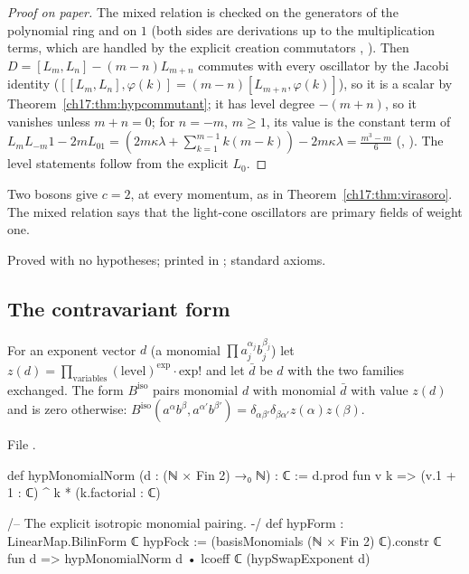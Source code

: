 \begin{proof}[Proof on paper]
The mixed relation is checked on the generators of the polynomial ring and
on $1$ (both sides are derivations up to the multiplication terms, which are handled by the explicit
creation commutators , ).  Then
$D=[L_m,L_n]-(m-n)L_{m+n}$ commutes with every oscillator by the Jacobi identity
($[[L_m,L_n],\varphi(k)]=(m-n)[L_{m+n},\varphi(k)]$), so it is a scalar by Theorem~\ref{ch17:thm:hypcommutant}; it has level
degree $-(m+n)$, so it vanishes unless $m+n=0$; for $n=-m$, $m\ge1$, its value is the constant term of
$L_mL_{-m}1-2mL_01=(2m\kappa\lambda+\sum_{k=1}^{m-1}k(m-k))-2m\kappa\lambda=\frac{m^3-m}6$
(, ).  The level statements follow from
the explicit $L_0$.
\end{proof}

\begin{physics}
Two bosons give $c=2$, at every momentum, as in Theorem~\ref{ch17:thm:virasoro}.  The mixed relation says
that the light-cone oscillators are primary fields of weight one.
\end{physics}

\begin{status}
Proved with no hypotheses; printed in ; standard axioms.
\end{status}

\subsection{The contravariant form}

\begin{definition}\label{ch17:def:hypform}
For an exponent vector $d$ (a monomial $\prod a_j^{\alpha_j}b_j^{\beta_j}$) let $z(d)=\prod_{\text{variables}}(\text{level})^{\text{exp}}\cdot\text{exp}!$
and let $\bar d$ be $d$ with the two families exchanged.  The form $B^{\mathrm{iso}}$ pairs monomial $d$ with
monomial $\bar d$ with value $z(d)$ and is zero otherwise: $B^{\mathrm{iso}}(a^\alpha b^\beta,a^{\alpha'}b^{\beta'})=\delta_{\alpha\beta'}\delta_{\beta\alpha'}z(\alpha)z(\beta)$.
\end{definition}

\noindent File .
\begin{leancode}
def hypMonomialNorm (d : (ℕ × Fin 2) →₀ ℕ) : ℂ :=
  d.prod fun v k => (v.1 + 1 : ℂ) ^ k * (k.factorial : ℂ)

/-- The explicit isotropic monomial pairing. -/
def hypForm : LinearMap.BilinForm ℂ hypFock :=
  (basisMonomials (ℕ × Fin 2) ℂ).constr ℂ fun d =>
    hypMonomialNorm d • lcoeff ℂ (hypSwapExponent d)
\end{leancode}

